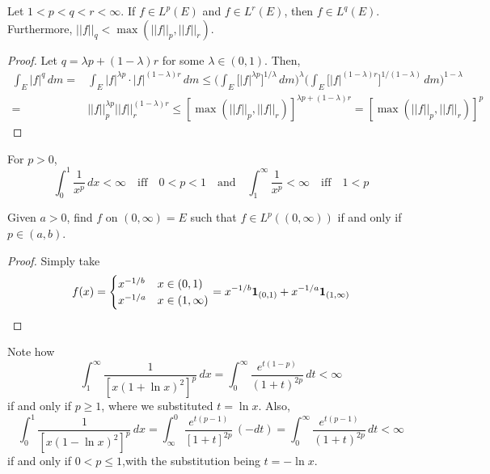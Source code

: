 \vspace{2ex}
\begin{thm}
Let $1<p<q<r<\infty $. If $f\in L^{p}(E)$ and $f\in L^{r}(E)$, then $f\in L^{q}(E)$. Furthermore, $||f||_{q}<\max (||f||_{p},||f||_{r})$. 
\end{thm}
\vspace{2ex}
\begin{proof}
Let $q=\lambda p+(1-\lambda )r$ for some $\lambda \in (0,1)$. Then,
\begin{align*}
\int _{E}|f|^{q}\,d m=&\int _{E}|f|^{\lambda p}\cdot |f|^{(1-\lambda )r}\,d m\leq \Big(\int _{E}\Big[|f|^{\lambda p}\Big]^{1/\lambda }\,d m\Big)^{\lambda }\Big(\int _{E}\Big[|f|^{(1-\lambda )r}\Big]^{1/(1-\lambda )}\,d m\Big)^{1-\lambda }
\\=&||f||^{\lambda p}_{p}||f||_{r}^{(1-\lambda )r}\leq [\max(||f||_{p},||f||_{r})]^{\lambda p+(1-\lambda )r}=[\max(||f||_{p},||f||_{r})]^{p}
\end{align*}
\end{proof}
\vspace{2ex}
\begin{rmk}
For $p>0$, 
\[
\int ^{1}_{0}\dfrac{1}{x^{p}}\,dx<\infty \quad\mathrm{iff}\quad0<p<1\quad \mathrm{and}\quad
\int ^{\infty }_{1}\dfrac{1}{x^{p}}<\infty \quad \mathrm{iff}\quad1<p
\]
\end{rmk}
\vspace{2ex}
\begin{ex}
Given $a>0$, find $f$ on $(0,\infty )=E$ such that $f\in L^{p}((0,\infty ))$ if and only if $p\in (a,b)$. 
\end{ex}
\vspace{2ex}
\begin{proof}
Simply take
\[f(x)=\begin{cases}
x^{-1/b}&x\in (0,1)\\
x^{-1/a}&x\in (1,\infty )
\end{cases}=x^{-1/b}{\bf 1}_{(0,1)}+x^{-1/a}{\bf 1}_{(1,\infty )}\]
\end{proof}
\vspace{2ex}
\begin{ex}
Note how
\[\int ^{\infty }_{1}\dfrac{1}{[x(1+\ln x)^2]^{p}}\,d x=\int ^{\infty }_{0}\dfrac{e^{t(1-p)}}{(1+t)^{2p}}\,d t<\infty \]
if and only if $p\geq 1$, where we substituted $t=\ln x$. Also,
\[\int ^{1}_{0}\dfrac{1}{[x(1-\ln x)^2]^{p}}\,dx =\int ^{0}_{\infty }\dfrac{e^{t(p-1)}}{[1+t]^{2p}}\,(-dt)=\int ^{\infty }_{0}\dfrac{e^{t(p-1)}}{(1+t)^{2p}}\,d t<\infty \]
if and only if $0<p\leq 1 $,with the substitution being $t=-\ln x$. 
\end{ex}

